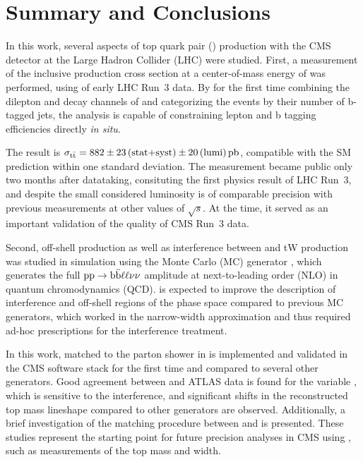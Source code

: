 \chapter{Summary and Conclusions}
\label{ch:summary}


In this work, several aspects of top quark pair (\ttbar) production with the CMS detector at the Large Hadron Collider (LHC) were studied. First, a measurement of the inclusive \ttbar production cross section at a center-of-mass energy of \sqrtsRIII was performed, using \lumiRIII of early LHC Run~3 data. By for the first time combining the dilepton and \ljets decay channels of \ttbar and categorizing the events by their number of b-tagged jets, the analysis is capable of constraining lepton and b tagging efficiencies directly \textit{in situ}. 

The result is $\sigma_{\mathrm{t \bar{t}}} = 882 \pm 23 \, \text{(stat+syst)} \pm 20 \, \text{(lumi)} \, \text{pb}$, compatible with the SM prediction within one standard deviation. The measurement became public only two months after datataking, consituting the first physics result of LHC Run~3, and despite the small considered luminosity is of comparable precision with previous \sigmatt measurements at other values of $\sqrt{s}$. At the time, it served as an important validation of the quality of CMS Run~3 data.


\smallskip

Second, off-shell \ttbar production as well as interference between \ttbar and tW production was studied in simulation using the Monte Carlo (MC) generator \bbfourl, which generates the full $\mathrm{pp} \rightarrow \mathrm{b \bar{b}} \ell \ell \nu \nu$ amplitude at next-to-leading order (NLO) in quantum chromodynamics (QCD). \bbfourl is expected to improve the description of \tttW interference and off-shell regions of the \ttbar phase space compared to previous \ttbar MC generators, which worked in the narrow-width approximation and thus required ad-hoc prescriptions for the interference treatment.

In this work, \bbfourl matched to the parton shower in \pythia is implemented and validated in the CMS software stack for the first time and compared to several other generators. Good agreement between \bbfourl and ATLAS data is found for the variable \mblminimax, which is sensitive to the \tttW interference, and significant shifts in the reconstructed top mass lineshape compared to other generators are observed. Additionally, a brief investigation of the matching procedure between \bbfourl and \pythia is presented. These studies represent the starting point for future precision \ttbar analyses in CMS using \bbfourl, such as measurements of the top mass and width.

